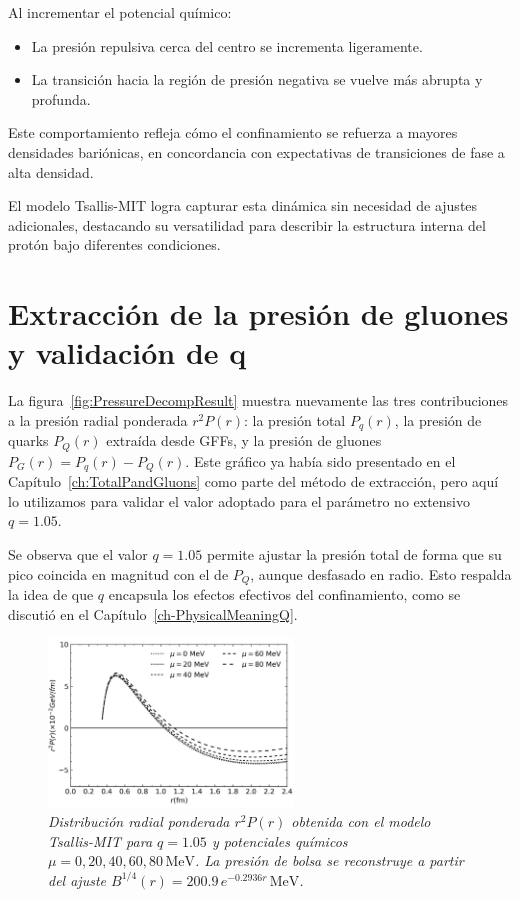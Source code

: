 Al incrementar el potencial químico:
\begin{itemize}
    \item La presión repulsiva cerca del centro se incrementa ligeramente.
    \item La transición hacia la región de presión negativa se vuelve más abrupta y profunda.
\end{itemize}

Este comportamiento refleja cómo el confinamiento se refuerza a mayores densidades bariónicas, en concordancia con expectativas de transiciones de fase a alta densidad.

El modelo Tsallis-MIT logra capturar esta dinámica sin necesidad de ajustes adicionales, destacando su versatilidad para describir la estructura interna del protón bajo diferentes condiciones.

\section{Extracción de la presión de gluones y validación de q}

La figura~\ref{fig:PressureDecompResult} muestra nuevamente las tres contribuciones a la presión radial ponderada \( r^2 P(r) \): la presión total \( P_q(r) \), la presión de quarks \( P_Q(r) \) extraída desde GFFs, y la presión de gluones \( P_G(r) = P_q(r) - P_Q(r) \). Este gráfico ya había sido presentado en el Capítulo~\ref{ch:TotalPandGluons} como parte del método de extracción, pero aquí lo utilizamos para validar el valor adoptado para el parámetro no extensivo \( q = 1.05 \).

Se observa que el valor \( q = 1.05 \) permite ajustar la presión total de forma que su pico coincida en magnitud con el de \( P_Q \), aunque desfasado en radio. Esto respalda la idea de que \( q \) encapsula los efectos efectivos del confinamiento, como se discutió en el Capítulo~\ref{ch-PhysicalMeaningQ}.

\begin{figure}
    \centering
    \includegraphics[width=0.58\textwidth]{./Images/TotalPressureTsallis.png}
    \caption[Efecto de \( \mu \) en la presión total radial]{\emph{Distribución radial ponderada \( r^2 P(r) \) obtenida con el modelo Tsallis-MIT para \( q = 1.05 \) y potenciales químicos \( \mu = 0, 20, 40, 60, 80\,\mathrm{MeV} \). La presión de bolsa se reconstruye a partir del ajuste \( B^{1/4}(r) = 200.9\,e^{-0.2936r}\,\mathrm{MeV} \).}}
    \label{fig:TotalPressureTsallis}
\end{figure}

